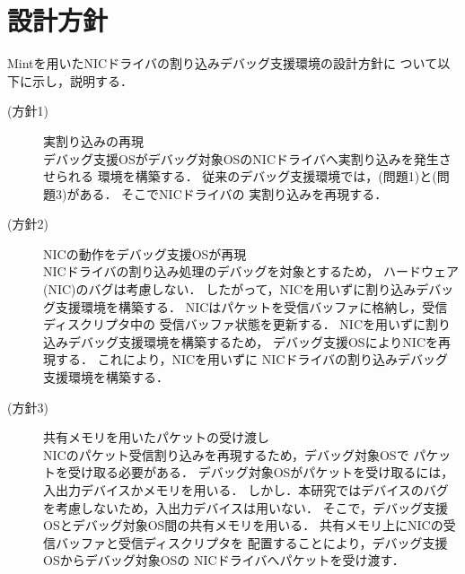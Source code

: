 \documentclass[tanilab-enum]{graduate}
\begin{document}
\section{設計方針}\label{sekkeihousin}
Mintを用いたNICドライバの割り込みデバッグ支援環境の設計方針に
ついて以下に示し，説明する．

\begin{description}
    \item[(方針1)] 実割り込みの再現\\
        デバッグ支援OSがデバッグ対象OSのNICドライバへ実割り込みを発生させられる
        環境を構築する．
        従来のデバッグ支援環境では，(問題1)と(問題3)がある．
        そこでNICドライバの
        実割り込みを再現する．

    \item[(方針2)] NICの動作をデバッグ支援OSが再現\\
        NICドライバの割り込み処理のデバッグを対象とするため，
        ハードウェア(NIC)のバグは考慮しない．
        したがって，NICを用いずに割り込みデバッグ支援環境を構築する．
        NICはパケットを受信バッファに格納し，受信ディスクリプタ中の
        受信バッファ状態を更新する．
        NICを用いずに割り込みデバッグ支援環境を構築するため，
        デバッグ支援OSによりNICを再現する．
        これにより，NICを用いずに
        NICドライバの割り込みデバッグ支援環境を構築する．

    \item[(方針3)] 共有メモリを用いたパケットの受け渡し\\
        NICのパケット受信割り込みを再現するため，デバッグ対象OSで
        パケットを受け取る必要がある．
        デバッグ対象OSがパケットを受け取るには，
        入出力デバイスかメモリを用いる．
        しかし．本研究ではデバイスのバグを考慮しないため，入出力デバイスは用いない．
        そこで，デバッグ支援OSとデバッグ対象OS間の共有メモリを用いる．
        共有メモリ上にNICの受信バッファと受信ディスクリプタを
        配置することにより，デバッグ支援OSからデバッグ対象OSの
        NICドライバへパケットを受け渡す．

\end{description}
\end{document}
